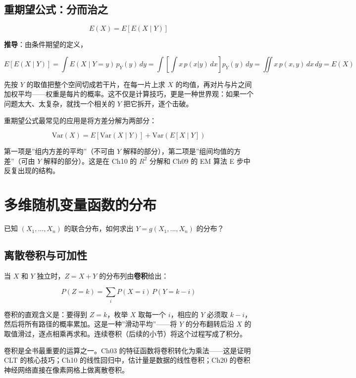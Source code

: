 \documentclass[
]{book}
\begin{document}
\subsection{重期望公式：分而治之}\label{ux91cdux671fux671bux516cux5f0fux5206ux800cux6cbbux4e4b}

\[E(X) = E[E(X \mid Y)]\]

\textbf{推导}：由条件期望的定义，

\[E[E(X \mid Y)] = \int E(X \mid Y=y) \, p_Y(y) \, dy = \int \left[ \int x \, p(x|y) \, dx \right] p_Y(y) \, dy = \iint x \, p(x,y) \, dx \, dy = E(X)\]

先按 \(Y\) 的取值把整个空间切成若干片，在每一片上求 \(X\) 的均值，再对片与片之间加权平均------权重是每片的概率。这不仅是计算技巧，更是一种世界观：如果一个问题太大、太复杂，就找一个相关的 \(Y\) 把它拆开，逐个击破。

重期望公式最常见的应用是将方差分解为两部分：

\[\text{Var}(X) = E[\text{Var}(X \mid Y)] + \text{Var}(E[X \mid Y])\]

第一项是''组内方差的平均''（不可由 \(Y\) 解释的部分），第二项是''组间均值的方差''（可由 \(Y\) 解释的部分）。这是在 Ch10 的 \(R^2\) 分解和 Ch09 的 EM 算法 E 步中反复出现的结构。

\section{多维随机变量函数的分布}\label{ux591aux7ef4ux968fux673aux53d8ux91cfux51fdux6570ux7684ux5206ux5e03}

已知 \((X_1, \ldots, X_n)\) 的联合分布，如何求出 \(Y = g(X_1, \ldots, X_n)\) 的分布？

\subsection{离散卷积与可加性}\label{ux79bbux6563ux5377ux79efux4e0eux53efux52a0ux6027}

当 \(X\) 和 \(Y\) 独立时，\(Z = X + Y\) 的分布列由\textbf{卷积}给出：

\[P(Z = k) = \sum_i P(X = i) \, P(Y = k - i)\]

卷积的直观含义是：要得到 \(Z=k\)，枚举 \(X\) 取每一个 \(i\)，相应的 \(Y\) 必须取 \(k-i\)，然后将所有路径的概率累加。这是一种''滑动平均''------将 \(Y\) 的分布翻转后沿 \(X\) 的取值滑过，逐点相乘再求和。连续卷积（后续的小节）将这个过程写成了积分。

卷积是全书最重要的运算之一。Ch03 的特征函数将卷积转化为乘法------这是证明 CLT 的核心技巧；Ch10 的线性回归中，估计量是数据的线性卷积；Ch20 的卷积神经网络直接在像素网格上做离散卷积。
\end{document}
